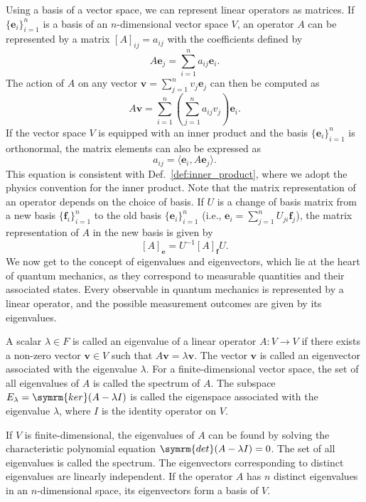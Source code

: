 Using a basis of a vector space, we can represent linear operators as matrices. If $\lbrace\symbf{e}_i\rbrace_{i=1}^n$ is a basis of an $n$-dimensional vector space $V$, an operator $A$ can be represented by a matrix $[A]_{ij}=a_{ij}$ with the coefficients defined by
\begin{equation}
A\symbf{e}_j=\sum_{i=1}^n a_{ij}\symbf{e}_i.
\end{equation}
The action of $A$ on any vector $\symbf{v}=\sum_{j=1}^n v_j\symbf{e}_j$ can then be computed as
\begin{equation}
A\symbf{v}=\sum_{i=1}^n\left(\sum_{j=1}^n a_{ij}v_j\right)\symbf{e}_i.
\end{equation}
If the vector space $V$ is equipped with an inner product and the basis $\lbrace\symbf{e}_i\rbrace_{i=1}^n$ is orthonormal, the matrix elements can also be expressed as
\begin{equation}
a_{ij}=\langle\symbf{e}_i,A\symbf{e}_j\rangle.
\end{equation}
This equation is consistent with Def.~\ref{def:inner_product}, where we adopt the physics convention for the inner product. Note that the matrix representation of an operator depends on the choice of basis. If $U$ is a change of basis matrix from a new basis $\lbrace\symbf{f}_i\rbrace_{i=1}^n$ to the old basis $\lbrace\symbf{e}_i\rbrace_{i=1}^n$ (i.e., $\symbf{e}_i=\sum_{j=1}^n U_{ji}\symbf{f}_j$), the matrix representation of $A$ in the new basis is given by
\begin{equation}\label{eq:change_of_basis}
[A]_{\symbf{e}}=U^{-1}[A]_{\symbf{f}}U.
\end{equation}
We now get to the concept of eigenvalues and eigenvectors, which lie at the heart of quantum mechanics, as they correspond to measurable quantities and their associated states. Every observable in quantum mechanics is represented by a linear operator, and the possible measurement outcomes are given by its eigenvalues.
\begin{definition}
A scalar $\lambda\in F$ is called an eigenvalue of a linear operator $A:V\to V$ if there exists a non-zero vector $\symbf{v}\in V$ such that $A\symbf{v}=\lambda\symbf{v}$. The vector $\symbf{v}$ is called an eigenvector associated with the eigenvalue $\lambda$. For a finite-dimensional vector space, the set of all eigenvalues of $A$ is called the spectrum of $A$. The subspace $E_\lambda=\symrm{ker}(A-\lambda I)$ is called the eigenspace associated with the eigenvalue $\lambda$, where $I$ is the identity operator on $V$.
\end{definition}
If $V$ is finite-dimensional, the eigenvalues of $A$ can be found by solving the characteristic polynomial equation $\symrm{det}(A-\lambda I)=0$. The set of all eigenvalues is called the spectrum. The eigenvectors corresponding to distinct eigenvalues are linearly independent. If the operator $A$ has $n$ distinct eigenvalues in an $n$-dimensional space, its eigenvectors form a basis of $V$.


